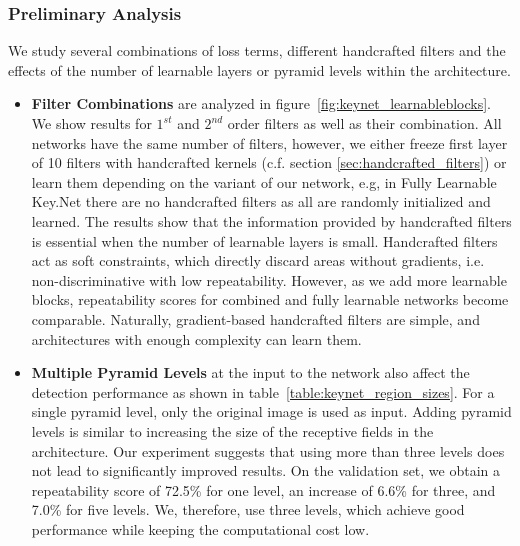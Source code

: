\subsubsection{Preliminary Analysis}

\label{subsec:preliminary_analysis}
We study several combinations of loss terms, different handcrafted filters and the effects of the number of learnable layers or pyramid levels within the architecture.

\begin{itemize}
    \item \textbf{Filter Combinations} are analyzed in figure~\ref{fig:keynet_learnableblocks}. We show results for $1^{st}$ and $2^{nd}$ order filters as well as their combination. All networks have the same number of filters, however, we either freeze first layer of 10 filters with handcrafted kernels (c.f. section \ref{sec:handcrafted_filters}) or learn them depending on the variant of our network, e.g, in Fully Learnable Key.Net there are no handcrafted filters as all are randomly initialized and learned. The results show that the information provided by handcrafted filters is essential when the number of learnable layers is small. Handcrafted filters act as soft constraints, which directly discard areas without gradients, i.e. non-discriminative with low repeatability. However, as we add more learnable blocks, repeatability scores for combined and fully learnable networks become comparable. Naturally, gradient-based handcrafted filters are simple, and architectures with enough complexity can learn them. %
    \item \textbf{Multiple Pyramid Levels} at the input to the network also affect the detection performance as shown in table~\ref{table:keynet_region_sizes}. For a single pyramid level, only the original image is used as input. Adding pyramid levels is similar to increasing the size of the receptive fields in the architecture. Our experiment suggests that using more than three levels does not lead to significantly improved results. On the validation set, we obtain a repeatability score of 72.5\% for one level,  an increase of 6.6\% for three, and 7.0\% for five levels. We, therefore, use three levels, which achieve good performance while keeping the computational cost low.
\end{itemize}

